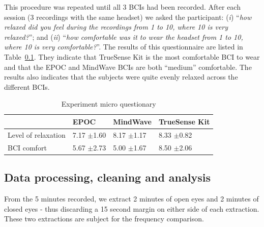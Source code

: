 \documentclass[a4paper,10pt,english,lof,lot,twoside]{puthesis}
\begin{document}
This procedure was repeated until all 3 BCIs had been recorded.
After each session (3 recordings with the same headset) we asked
the participant: (\emph{i}) ``\emph{how relaxed did you feel during the recordings
from 1 to 10, where 10 is very relaxed?}''; and (\emph{ii}) ``\emph{how comfortable was
it to wear the headset from 1 to 10, where 10 is very comfortable?}''. The
results of this questionnaire are listed in Table \ref{ch-experiment/index:table-experiment-final-relaxed-comfort}. They indicate that
TrueSense Kit is the most comfortable BCI to wear and that the EPOC and
MindWave BCIs are both ``medium'' comfortable. The results also indicates
that the subjects were quite evenly relaxed across the different BCIs.


\begin{table}
\capstart
\begin{center}

\begin{tabular}{l l l l}

\toprule
\textsf{\relax } & \textsf{\relax 
EPOC
} & \textsf{\relax 
MindWave
} & \textsf{\relax 
TrueSense Kit
}\\
\hline\midrule

Level of relaxation
 & 
7.17 \(\pm\)1.60
 & 
8.17 \(\pm\)1.17
 & 
8.33 \(\pm\)0.82
\\

BCI comfort
 & 
5.67 \(\pm\)2.73
 & 
5.00 \(\pm\)1.67
 & 
8.50 \(\pm\)2.06
\\
\hline\bottomrule

\end{tabular}
\caption[Experiment micro questionary]{Experiment micro questionary}\label{ch-experiment/index:table-experiment-final-relaxed-comfort}
\end{center}
\end{table}


\subsection{Data processing, cleaning and analysis}
\label{ch-experiment/index:table-experiment-final-relaxed-comfort}\label{ch-experiment/index:ch-experiment-processing}\label{ch-experiment/index:data-processing-cleaning-and-analysis}
From the 5 minutes recorded, we extract 2 minutes of open eyes and 2 minutes of
closed eyes - thus discarding a 15 second margin on either side of each
extraction. These two extractions are subject for the frequency comparison.
\end{document}
